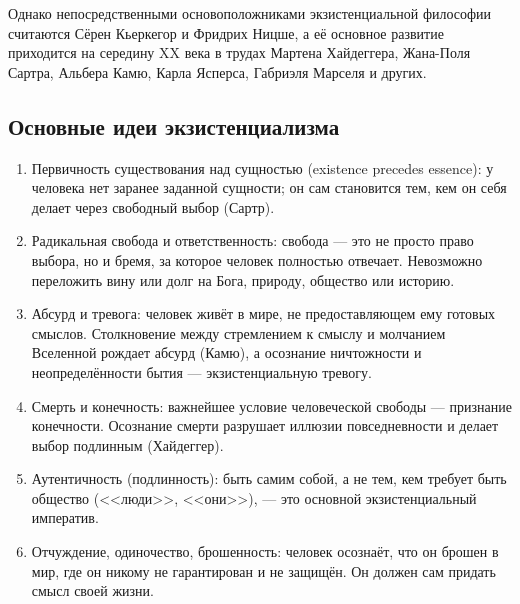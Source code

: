 \documentclass[12pt,a4paper]{article}
\begin{document}
	Однако непосредственными основоположниками экзистенциальной философии считаются Сёрен Кьеркегор и Фридрих Ницше, а её основное развитие приходится на середину XX века в трудах Мартена Хайдеггера, Жана-Поля Сартра, Альбера Камю, Карла Ясперса, Габриэля Марселя и других.
	
	\subsection{Основные идеи экзистенциализма}
	\begin{enumerate}
		\item Первичность существования над сущностью (existence precedes essence): у человека нет заранее заданной сущности; он сам становится тем, кем он себя делает через свободный выбор (Сартр).
		
		\item Радикальная свобода и ответственность: свобода — это не просто право выбора, но и бремя, за которое человек полностью отвечает. Невозможно переложить вину или долг на Бога, природу, общество или историю.
		
		\item Абсурд и тревога: человек живёт в мире, не предоставляющем ему готовых смыслов. Столкновение между стремлением к смыслу и молчанием Вселенной рождает абсурд (Камю), а осознание ничтожности и неопределённости бытия — экзистенциальную тревогу.
		
		\item Смерть и конечность: важнейшее условие человеческой свободы — признание конечности. Осознание смерти разрушает иллюзии повседневности и делает выбор подлинным (Хайдеггер).
		
		\item Аутентичность (подлинность): быть самим собой, а не тем, кем требует быть общество (<<люди>>, <<они>>), — это основной экзистенциальный императив.
		
		\item Отчуждение, одиночество, брошенность: человек осознаёт, что он брошен в мир, где он никому не гарантирован и не защищён. Он должен сам придать смысл своей жизни.
	\end{enumerate}
	
\end{document}
